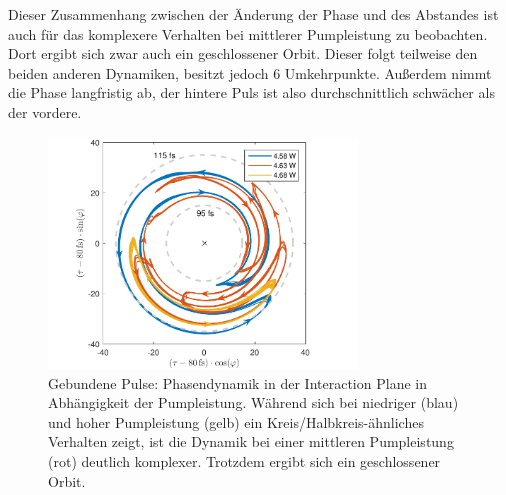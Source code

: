 \documentclass[bachelor,       %
               twoside,        %
               BCOR10mm,       %
               english,ngerman, %
               ]{GAUBM}
\begin{document}
Dieser Zusammenhang zwischen der Änderung der Phase und des Abstandes ist auch für das komplexere Verhalten bei mittlerer Pumpleistung zu beobachten.
Dort ergibt sich zwar auch ein geschlossener Orbit.
Dieser folgt teilweise den beiden anderen Dynamiken, besitzt jedoch 6 Umkehrpunkte.
Außerdem nimmt die Phase langfristig ab, der hintere Puls ist also durchschnittlich schwächer als der vordere.
 \begin{figure}[!htb]
	\centering
	\includegraphics[width=0.73\textwidth]{figures/4ms_25GSA_400m_MLrun_runBounceFix_InteractionPlaneArrows_final2.pdf}
	\caption{Gebundene Pulse: Phasendynamik in der Interaction Plane  in Abhängigkeit der Pumpleistung.
	Während sich bei niedriger (blau) und hoher Pumpleistung (gelb) ein Kreis/Halbkreis-ähnliches Verhalten zeigt, ist die Dynamik bei einer mittleren Pumpleistung (rot) deutlich komplexer. Trotzdem ergibt sich ein geschlossener Orbit.}
	\label{fig:interactionPlane}
\end{figure}
\end{document}
